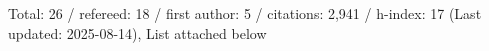Total: 26 / refereed: 18 / first author: 5 / citations: 2,941 / h-index: 17 (Last updated: 2025-08-14), List attached below